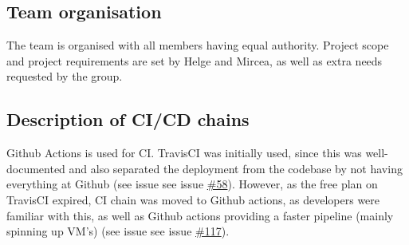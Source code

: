 

\subsection{Team organisation}
The team is organised with all members having equal authority. Project scope and project requirements are set by Helge and Mircea, as well as extra needs requested by the group. 

\subsection{Description of CI/CD chains}
Github Actions is used for CI. TravisCI was initially used, since this was well-documented and also separated the deployment from the codebase by not having everything at Github (see issue see issue \href{https://github.com/DevelOpsITU/MiniTwit/issues/58}{\#58}). However, as the free plan on TravisCI expired, CI chain was moved to Github actions, as developers were familiar with this, as well as Github actions providing a faster pipeline (mainly spinning up VM's) (see issue see issue \href{https://github.com/DevelOpsITU/MiniTwit/issues/117}{\#117}).\\

